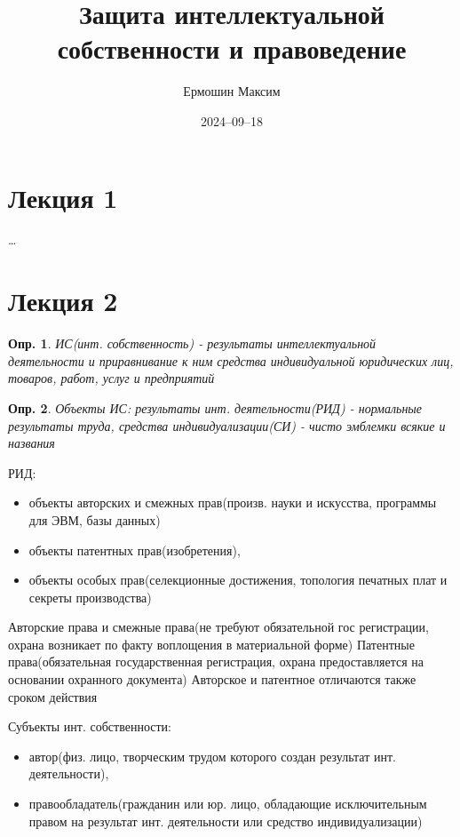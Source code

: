\documentclass[12pt]{article}
\title{Защита интеллектуальной собственности и правоведение}
\author{Ермошин Максим}
\date{2024–09–18}
\newtheorem{definition}{Опр.}
\begin{document}
\maketitle

\section{Лекция 1}

\dots

\section{Лекция 2}

\begin{definition}
ИС(инт. собственность) - результаты интеллектуальной деятельности и приравнивание к ним средства индивидуальной юридических лиц, товаров, работ, услуг и предприятий
\end{definition}

\begin{definition}
Объекты ИС: результаты инт. деятельности(РИД) - нормальные результаты труда, средства индивидуализации(СИ) - чисто эмблемки всякие и названия
\end{definition}

РИД: 
\begin{itemize}
\item объекты авторских и смежных прав(произв. науки и искусства, программы для ЭВМ, базы данных)
\item объекты патентных прав(изобретения), 
\item объекты особых прав(селекционные достижения, топология печатных плат и секреты производства)
\end{itemize}

	Авторские права и смежные права(не требуют обязательной гос регистрации, охрана возникает по факту воплощения в материальной форме)
Патентные права(обязательная государственная регистрация, охрана предоставляется на основании охранного документа)
Авторское и патентное отличаются также сроком действия

Субъекты инт. собственности: 
\begin{itemize}
\item автор(физ. лицо, творческим трудом которого создан результат инт. деятельности), 
\item правообладатель(гражданин или юр. лицо, обладающие исключительным правом на результат инт. деятельности или средство индивидуализации)
\end{itemize}
\end{document}
